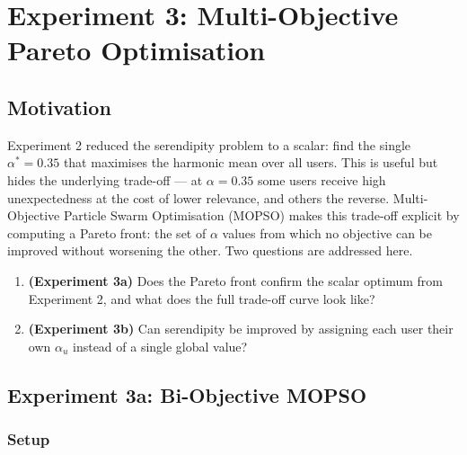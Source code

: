 
\section{Experiment 3: Multi-Objective Pareto Optimisation}
\label{sec:experiment3}

\subsection{Motivation}

Experiment 2 reduced the serendipity problem to a scalar: find the single
$\alpha^* = 0.35$ that maximises the harmonic mean over all users.
This is useful but hides the underlying trade-off — at $\alpha = 0.35$
some users receive high unexpectedness at the cost of lower relevance, and
others the reverse.  Multi-Objective Particle Swarm Optimisation (MOPSO)
makes this trade-off explicit by computing a Pareto front: the set of
$\alpha$ values from which no objective can be improved without worsening
the other.  Two questions are addressed here.

\begin{enumerate}
    \item \textbf{(Experiment 3a)} Does the Pareto front confirm the scalar
          optimum from Experiment 2, and what does the full trade-off curve
          look like?
    \item \textbf{(Experiment 3b)} Can serendipity be improved by assigning
          each user their own $\alpha_u$ instead of a single global value?
\end{enumerate}

\subsection{Experiment 3a: Bi-Objective MOPSO}
\label{sec:exp3a}

\subsubsection{Setup}

